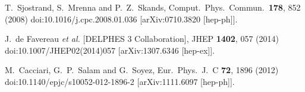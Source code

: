 \documentclass{ws-mpla}
\begin{document}
\begin{thebibliography}{99}
  T.~Sjostrand, S.~Mrenna and P.~Z.~Skands,
  Comput.\ Phys.\ Commun.\  {\bf 178}, 852 (2008)
  doi:10.1016/j.cpc.2008.01.036
  [arXiv:0710.3820 [hep-ph]].

  J.~de Favereau {\it et al.} [DELPHES 3 Collaboration],
  JHEP {\bf 1402}, 057 (2014)
  doi:10.1007/JHEP02(2014)057
  [arXiv:1307.6346 [hep-ex]].

  M.~Cacciari, G.~P.~Salam and G.~Soyez,
  Eur.\ Phys.\ J.\ C {\bf 72}, 1896 (2012)
  doi:10.1140/epjc/s10052-012-1896-2
  [arXiv:1111.6097 [hep-ph]].
\end{thebibliography}
\end{document}
